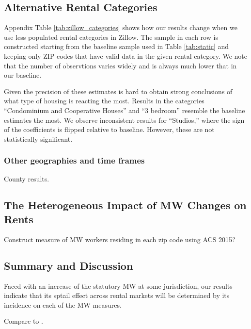 \subsection{Alternative Rental Categories}

Appendix Table \ref{tab:zillow_categories} shows how our results change when we 
use less populated rental categories in Zillow.
The sample in each row is constructed starting from the baseline sample used in 
Table \ref{tab:static} and keeping only ZIP codes that have valid data in the 
given rental category.
We note that the number of observtions varies widely and is always much lower
that in our baseline.

Given the precision of these estimates is hard to obtain strong conclusions of
what type of housing is reacting the most.
Results in the categories ``Condominium and Cooperative Houses'' and ``3 bedroom''
resemble the baseline estimates the most.
We observe inconsistent results for ``Studios,'' where the sign of the coefficients
is flipped relative to baseline.
However, these are not statistically significant.

\subsubsection*{Other geographies and time frames}

County results.

\subsection{The Heterogeneous Impact of MW Changes on Rents}
\label{sec:heterogeneity_results}

Construct measure of MW workers residing in each zip code using ACS 2015?

\subsection{Summary and Discussion}
\label{sec:results_discussion}

Faced with an increase of the statutory MW at some jurisdiction, our results
indicate that its sptail effect across rental markets will be determined by 
its incidence on each of the MW measures.


Compare to \textcite{Yamagishi2019}.
